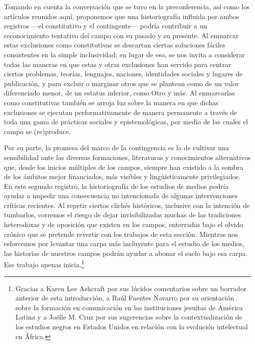 \documentclass{tufte-handout}
\begin{document}
Tomando en cuenta la conversación que se tuvo en la preconferencia, así
como los artículos reunidos aquí, proponemos que una historiografía
influida por ambos registros ---el constitutivo y el contingente---
podría contribuir a un reconocimiento tentativo del campo con su pasado
y su presente. Al enmarcar estas exclusiones como constitutivas se
descartan ciertas soluciones fáciles consistentes en la simple
inclusividad; en lugar de eso, se nos invita a considerar todas las
maneras en que estas y otras exclusiones han servido para centrar
ciertos problemas, teorías, lenguajes, naciones, identidades sociales y
lugares de publicación, y para excluir o marginar otros que se plantean
como de un valor diferenciado menor, de un estatus inferior, como Otro y
más. Al enmarcarlas como constitutivas también se arroja luz sobre la
manera en que dichas exclusiones se ejecutan performativamente de manera
permanente a través de toda una gama de prácticas sociales y
epistemológicas, por medio de las cuales el campo se (re)produce.

Por su parte, la promesa del marco de la contingencia es la de cultivar
una sensibilidad ante las diversas formaciones, literaturas y
conocimientos alternativos que, desde los inicios múltiples de los
campos, siempre han existido a la sombra de los ámbitos mejor
financiados, más visibles y lingüísticamente privilegiados. En este
segundo registro, la historiografía de los estudios de medios podría
ayudar a impedir una consecuencia no intencionada de algunas
intervenciones críticas recientes. Al repetir ciertos clichés
históricos, inclusive con la intención de tumbarlos, corremos el riesgo
de dejar invisibilizadas muchas de las tradiciones heterodoxas y de
oposición que existen en los campos, enterradas bajo el olvido crónico
que se pretende revertir con los trabajos de esta sección. Mientras nos
esforcemos por levantar una carpa más incluyente para el estudio de los
medios, las historias de nuestros campos podrán ayudar a abonar el suelo
bajo esa carpa. Ese trabajo apenas inicia.\footnote{Gracias a Karen Lee
  Ashcraft por sus lúcidos comentarios sobre un borrador anterior de
  esta introducción, a Raúl Fuentes Navarro por su orientación sobre la
  formación en comunicación en las instituciones jesuitas de América
  Latina y a Joëlle M. Cruz por sus sugerencias sobre la
  contextualización de los estudios negros en Estados Unidos en relación
  con la evolución intelectual en África.}
\end{document}
